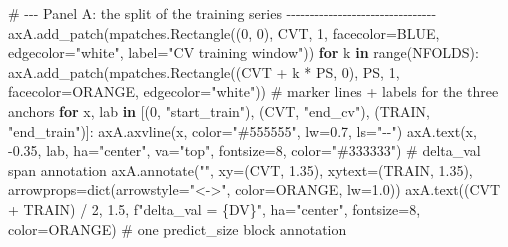 \documentclass[
  english,
  letterpaper,
]{scrbook}
\newenvironment{Shaded}{\begin{snugshade}}{\end{snugshade}}
\newcommand{\BuiltInTok}[1]{\textcolor[rgb]{0.00,0.23,0.31}{#1}}
\newcommand{\CommentTok}[1]{\textcolor[rgb]{0.37,0.37,0.37}{#1}}
\newcommand{\ControlFlowTok}[1]{\textcolor[rgb]{0.00,0.23,0.31}{\textbf{#1}}}
\newcommand{\DecValTok}[1]{\textcolor[rgb]{0.68,0.00,0.00}{#1}}
\newcommand{\FloatTok}[1]{\textcolor[rgb]{0.68,0.00,0.00}{#1}}
\newcommand{\KeywordTok}[1]{\textcolor[rgb]{0.00,0.23,0.31}{\textbf{#1}}}
\newcommand{\NormalTok}[1]{\textcolor[rgb]{0.00,0.23,0.31}{#1}}
\newcommand{\OperatorTok}[1]{\textcolor[rgb]{0.37,0.37,0.37}{#1}}
\newcommand{\SpecialCharTok}[1]{\textcolor[rgb]{0.37,0.37,0.37}{#1}}
\newcommand{\SpecialStringTok}[1]{\textcolor[rgb]{0.13,0.47,0.30}{#1}}
\newcommand{\StringTok}[1]{\textcolor[rgb]{0.13,0.47,0.30}{#1}}
\begin{document}
\begin{Shaded}
\begin{Highlighting}[]
\CommentTok{\# {-}{-}{-} Panel A: the split of the training series {-}{-}{-}{-}{-}{-}{-}{-}{-}{-}{-}{-}{-}{-}{-}{-}{-}{-}{-}{-}{-}{-}{-}{-}{-}{-}{-}{-}{-}{-}{-}{-}}
\NormalTok{axA.add\_patch(mpatches.Rectangle((}\DecValTok{0}\NormalTok{, }\DecValTok{0}\NormalTok{), CVT, }\DecValTok{1}\NormalTok{, facecolor}\OperatorTok{=}\NormalTok{BLUE,}
\NormalTok{                                 edgecolor}\OperatorTok{=}\StringTok{"white"}\NormalTok{, label}\OperatorTok{=}\StringTok{"CV training window"}\NormalTok{))}
\ControlFlowTok{for}\NormalTok{ k }\KeywordTok{in} \BuiltInTok{range}\NormalTok{(NFOLDS):}
\NormalTok{    axA.add\_patch(mpatches.Rectangle((CVT }\OperatorTok{+}\NormalTok{ k }\OperatorTok{*}\NormalTok{ PS, }\DecValTok{0}\NormalTok{), PS, }\DecValTok{1}\NormalTok{, facecolor}\OperatorTok{=}\NormalTok{ORANGE,}
\NormalTok{                                     edgecolor}\OperatorTok{=}\StringTok{"white"}\NormalTok{))}
\CommentTok{\# marker lines + labels for the three anchors}
\ControlFlowTok{for}\NormalTok{ x, lab }\KeywordTok{in}\NormalTok{ [(}\DecValTok{0}\NormalTok{, }\StringTok{"start\_train"}\NormalTok{), (CVT, }\StringTok{"end\_cv"}\NormalTok{), (TRAIN, }\StringTok{"end\_train"}\NormalTok{)]:}
\NormalTok{    axA.axvline(x, color}\OperatorTok{=}\StringTok{"\#555555"}\NormalTok{, lw}\OperatorTok{=}\FloatTok{0.7}\NormalTok{, ls}\OperatorTok{=}\StringTok{"{-}{-}"}\NormalTok{)}
\NormalTok{    axA.text(x, }\OperatorTok{{-}}\FloatTok{0.35}\NormalTok{, lab, ha}\OperatorTok{=}\StringTok{"center"}\NormalTok{, va}\OperatorTok{=}\StringTok{"top"}\NormalTok{, fontsize}\OperatorTok{=}\DecValTok{8}\NormalTok{, color}\OperatorTok{=}\StringTok{"\#333333"}\NormalTok{)}
\CommentTok{\# delta\_val span annotation}
\NormalTok{axA.annotate(}\StringTok{""}\NormalTok{, xy}\OperatorTok{=}\NormalTok{(CVT, }\FloatTok{1.35}\NormalTok{), xytext}\OperatorTok{=}\NormalTok{(TRAIN, }\FloatTok{1.35}\NormalTok{),}
\NormalTok{             arrowprops}\OperatorTok{=}\BuiltInTok{dict}\NormalTok{(arrowstyle}\OperatorTok{=}\StringTok{"\textless{}{-}\textgreater{}"}\NormalTok{, color}\OperatorTok{=}\NormalTok{ORANGE, lw}\OperatorTok{=}\FloatTok{1.0}\NormalTok{))}
\NormalTok{axA.text((CVT }\OperatorTok{+}\NormalTok{ TRAIN) }\OperatorTok{/} \DecValTok{2}\NormalTok{, }\FloatTok{1.5}\NormalTok{, }\SpecialStringTok{f"delta\_val = }\SpecialCharTok{\{}\NormalTok{DV}\SpecialCharTok{\}}\SpecialStringTok{"}\NormalTok{, ha}\OperatorTok{=}\StringTok{"center"}\NormalTok{,}
\NormalTok{         fontsize}\OperatorTok{=}\DecValTok{8}\NormalTok{, color}\OperatorTok{=}\NormalTok{ORANGE)}
\CommentTok{\# one predict\_size block annotation}

\end{Highlighting}
\end{Shaded}
\end{document}
